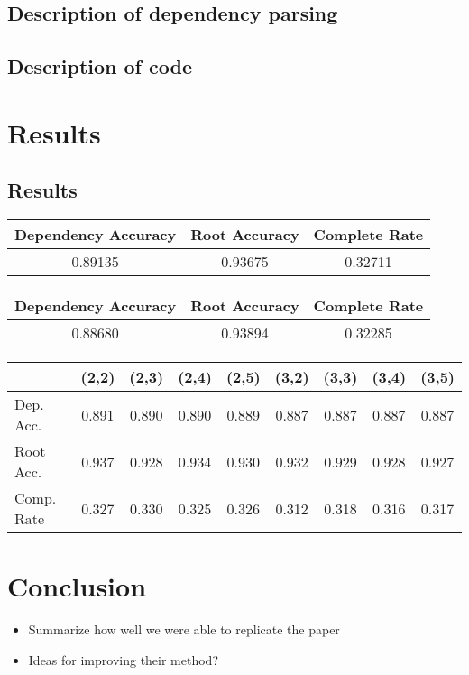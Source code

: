\documentclass[12pt,fleqn]{article}
\begin{document}
\subsection{Description of dependency parsing}
\subsection{Description of code}

\section{Results}
\subsection{Results}

    \begin{center}
        \begin{tabular}{|c|c|c|}
            \hline Dependency Accuracy & Root Accuracy & Complete Rate \\ \hline
            0.89135 & 0.93675 & 0.32711 \\ \hline
        \end{tabular}
    \end{center}

    \begin{center}
        \begin{tabular}{|c|c|c|}
            \hline Dependency Accuracy & Root Accuracy & Complete Rate \\ \hline
            0.88680 & 0.93894 & 0.32285 \\ \hline
        \end{tabular}
    \end{center}


    \begin{center}
        \begin{tabular}{|l|cccc|cccc|}
            \cline{2-9} \multicolumn{1}{c|}{} & (2,2) & (2,3) & (2,4) & (2,5) & (3,2) & (3,3) & (3,4) & (3,5) \\ \hline
            Dep. Acc. & 0.891 & 0.890 & 0.890 & 0.889 & 0.887 & 0.887 & 0.887 & 0.887 \\
            Root Acc. & 0.937 & 0.928 & 0.934 & 0.930 & 0.932 & 0.929 & 0.928 & 0.927 \\
            Comp. Rate & 0.327 & 0.330 & 0.325 & 0.326 & 0.312 & 0.318 & 0.316 & 0.317 \\ \hline
        \end{tabular}
    \end{center}


\section{Conclusion}
\begin{itemize}
\item Summarize how well we were able to replicate the paper
\item Ideas for improving their method?
\end{itemize}
\end{document}
